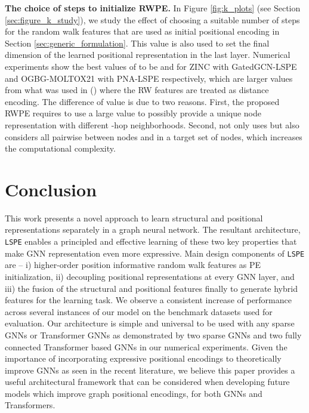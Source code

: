 \documentclass{article} \usepackage{iclr2021_conference,times}
\begin{document}
{\bf The choice of  steps to initialize RWPE.}
\label{sec:experiments_ablation_k}
In Figure \ref{fig:k_plots} (see Section \ref{sec:figure_k_study}), we study the effect of choosing a suitable number of  steps for the random walk features that are used as initial positional encoding in Section \ref{sec:generic_formulation}.
This value  is also used to set the final dimension of the learned positional representation in the last layer. Numerical experiments show the best values of  to be  and  for ZINC with GatedGCN-LSPE and OGBG-MOLTOX21 with PNA-LSPE respectively, which are larger values from what was used in \cite{li2020distance} () where the RW features are treated as distance encoding. The difference of  value is due to two reasons. First, the proposed RWPE requires to use a large  value to possibly provide a unique node representation with different -hop neighborhoods. Second, \cite{li2020distance} not only uses  but also considers all pairwise  between nodes  and  in a target set of nodes, which increases the computational complexity. 





\section{Conclusion}
\label{sec:conclusion}
This work presents a novel approach to learn structural and positional representations separately in a graph neural network. The resultant architecture, \texttt{LSPE} enables a principled and effective learning of these two key properties that make GNN representation even more expressive. Main design components of \texttt{LSPE} are -- i) higher-order position informative random walk features as PE initialization, ii) decoupling positional representations at every GNN layer, and iii) the fusion of the structural and positional features finally to generate hybrid features for the learning task. We observe a consistent increase of performance across several instances of our model on the benchmark datasets used for evaluation. Our architecture is simple and universal to be used with any sparse GNNs or Transformer GNNs as demonstrated by two sparse GNNs and two fully connected Transformer based GNNs in our numerical experiments. Given the importance of incorporating expressive positional encodings to theoretically improve GNNs as seen in the recent literature, we believe this paper provides a useful architectural framework that can be considered when developing future models which improve graph positional encodings, for both GNNs and Transformers.
\end{document}

